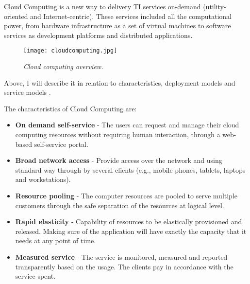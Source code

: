 Cloud Computing is a new way to delivery TI services on-demand (utility-oriented and Internet-centric). These services included all the computational power, from hardware infrastructure as a set of virtual machines to software services as development platforms and distributed applications.

\begin{figure}[!ht]
\begin{center}
\texttt{[image: cloudcomputing.jpg]}
\caption{\small \sl Cloud computing overview.\label{fig:cloudcomputing}}
\end{center}
\end{figure}

Above, I will describe it in relation to characteristics, deployment models and service models \cite{schouten2013ibm}.

The characteristics of Cloud Computing are:
\begin{itemize}
	\item \textbf{On demand self-service} 	- The users can request and manage their cloud computing resources without requiring human interaction, through a web-based self-service portal.
	\item \textbf{Broad network access 	}	- Provide access over the network and using standard way through by several clients (e.g., mobile phones, tablets, laptops and workstations).
	\item \textbf{Resource pooling 		}	- The computer resources are pooled to serve multiple customers through the safe separation of the resources at logical level.
	\item \textbf{Rapid elasticity 		}	- Capability of resources to be elastically provisioned and released. Making sure of the application will have exactly the capacity that it needs at any point of time.
	\item \textbf{Measured service 		}	- The service is monitored, measured and reported transparently based on the usage. The clients pay in accordance with the service spent.
\end{itemize}

